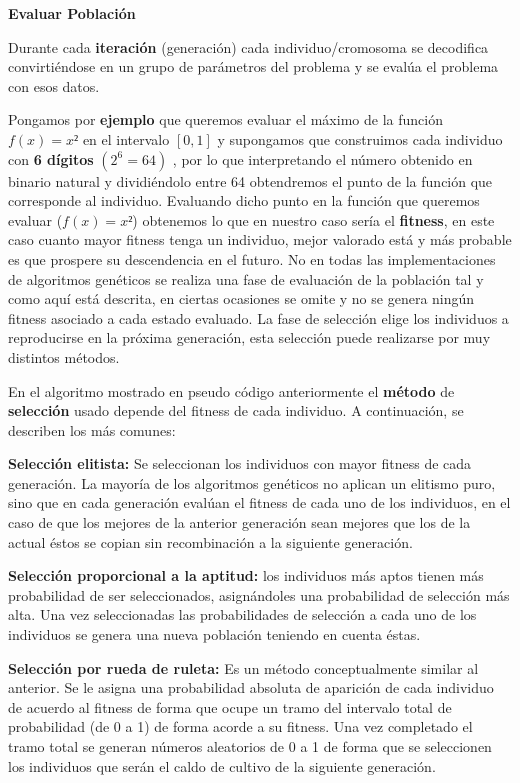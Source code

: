 \documentclass[
  a4paper,
  DIV=11,
  numbers=noendperiod]{scrreprt}
\begin{document}
\textbf{Evaluar Población}

Durante cada \textbf{iteración} (generación) cada individuo/cromosoma se
decodifica convirtiéndose en un grupo de parámetros del problema y se
evalúa el problema con esos datos.

Pongamos por \textbf{ejemplo} que queremos evaluar el máximo de la
función \(f(x)=x²\) en el intervalo \([0,1]\) y supongamos que
construimos cada individuo con \textbf{6 dígitos} \((2^6=64)\) , por lo
que interpretando el número obtenido en binario natural y dividiéndolo
entre 64 obtendremos el punto de la función que corresponde al
individuo. Evaluando dicho punto en la función que queremos evaluar
(\(f(x)=x²\)) obtenemos lo que en nuestro caso sería el
\textbf{fitness}, en este caso cuanto mayor fitness tenga un individuo,
mejor valorado está y más probable es que prospere su descendencia en el
futuro. No en todas las implementaciones de algoritmos genéticos se
realiza una fase de evaluación de la población tal y como aquí está
descrita, en ciertas ocasiones se omite y no se genera ningún fitness
asociado a cada estado evaluado. La fase de selección elige los
individuos a reproducirse en la próxima generación, esta selección puede
realizarse por muy distintos métodos.

En el algoritmo mostrado en pseudo código anteriormente el
\textbf{método} de \textbf{selección} usado depende del fitness de cada
individuo. A continuación, se describen los más comunes:

\textbf{Selección elitista:} Se seleccionan los individuos con mayor
fitness de cada generación. La mayoría de los algoritmos genéticos no
aplican un elitismo puro, sino que en cada generación evalúan el fitness
de cada uno de los individuos, en el caso de que los mejores de la
anterior generación sean mejores que los de la actual éstos se copian
sin recombinación a la siguiente generación.

\textbf{Selección proporcional a la aptitud:} los individuos más aptos
tienen más probabilidad de ser seleccionados, asignándoles una
probabilidad de selección más alta. Una vez seleccionadas las
probabilidades de selección a cada uno de los individuos se genera una
nueva población teniendo en cuenta éstas.

\textbf{Selección por rueda de ruleta:} Es un método conceptualmente
similar al anterior. Se le asigna una probabilidad absoluta de aparición
de cada individuo de acuerdo al fitness de forma que ocupe un tramo del
intervalo total de probabilidad (de 0 a 1) de forma acorde a su fitness.
Una vez completado el tramo total se generan números aleatorios de 0 a 1
de forma que se seleccionen los individuos que serán el caldo de cultivo
de la siguiente generación.
\end{document}
